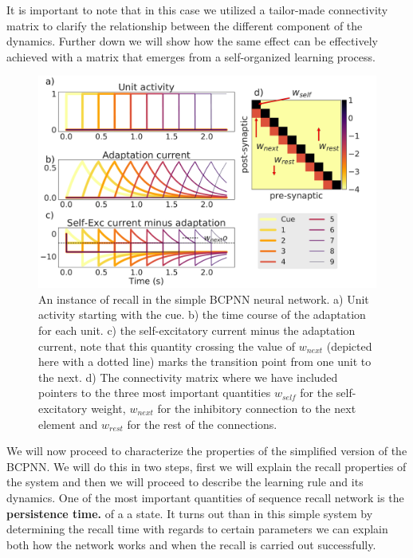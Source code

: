 \documentclass[10pt,a4paper]{article}
\begin{document}
It is important to note that in this case we utilized a tailor-made connectivity matrix to clarify the relationship between the different component of the dynamics. Further down we will show how the same effect can be effectively achieved with a matrix that emerges from a self-organized learning process.  

\begin{figure}[H]
\centering
\includegraphics[scale=0.26]{simple_bcpnn_recall.pdf}
\caption{An instance of recall in the simple BCPNN neural network. a) Unit activity starting with the cue. b) the time course of the adaptation for each unit. c) the self-excitatory current minus the adaptation current, note that this quantity crossing the value of $w_{next}$ (depicted here with a dotted line) marks the transition point from one unit to the next. d) The connectivity matrix where we have included pointers to the three most important quantities $w_{self}$ for the self-excitatory weight, $w_{next}$ for the inhibitory connection to the next element and $w_{rest}$ for the rest of the connections.}
\label{fig:bcpnn_simple_recall}
\end{figure}


We will now proceed to characterize the properties of the simplified version of the BCPNN. We will do this in two steps, first we will explain the recall properties of the system and then we will proceed to describe the learning rule and its dynamics. One of the most important quantities of sequence recall network is the \textbf{persistence time.} of a a state. It turns out than in this simple system by determining the recall time with regards to certain parameters we can explain both how the network works and when the recall is carried out successfully.
\end{document}
